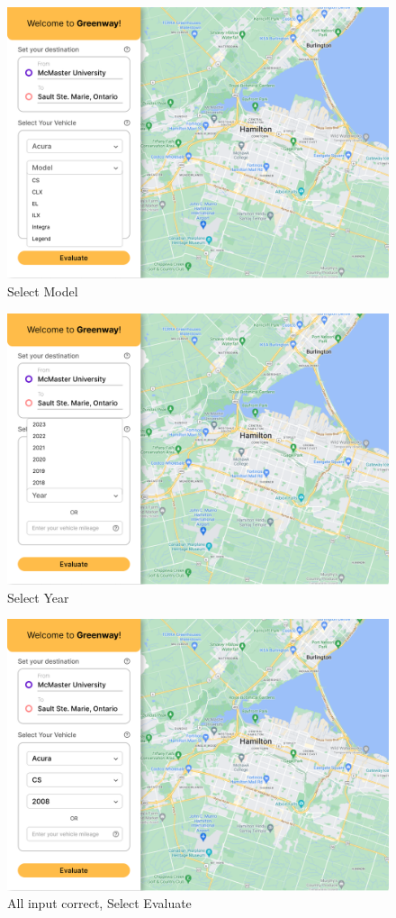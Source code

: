 \documentclass[12pt, titlepage]{article}
\begin{document}
\begin{figure}[h!]
    \centering
    \includegraphics[scale=0.26]{Desktop-4.png}
    \caption{Select Model}
\end{figure}
\begin{figure}[h!]
    \centering
    \includegraphics[scale=0.26]{Desktop-5.png}
    \caption{Select Year}
\end{figure}
\begin{figure}[h!]
    \centering
    \includegraphics[scale=0.26]{Desktop-6.png}
    \caption{All input correct, Select Evaluate}
\end{figure}
\end{document}
